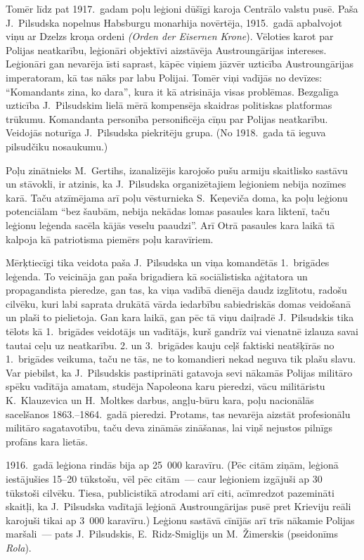 \documentclass[twoside,a5paper,12pt,fleqn,openany]{extbook}
\newcommand{\pltxti}[1]{\textit{\textpolish{#1}}}
\newcommand{\detxti}[1]{\textit{\textgerman{#1}}}
\begin{document}
Tomēr līdz pat 1917.~gadam poļu leģioni dūšīgi karoja Centrālo valstu pusē. Paša J.~Pilsudska nopelnus Habsburgu monarhija novērtēja, 1915.~gadā apbalvojot viņu ar Dzelzs kroņa ordeni \detxti{(Orden der Eisernen Krone}). Vēloties karot par Polijas neatkarību, leģionāri objektīvi aizstāvēja Austroungārijas intereses. Leģionāri gan nevarēja īsti saprast, kāpēc viņiem jāzvēr uzticība Austroungārijas imperatoram, kā tas nāks par labu Polijai. Tomēr viņi vadījās no devīzes: ``Komandants zina, ko dara'', kura it kā atrisināja visas problēmas. Bezgalīga uzticība J.~Pilsudskim lielā mērā kompensēja skaidras politiskas platformas trūkumu. Komandanta personība personificēja cīņu par Polijas neatkarību. Veidojās noturīga J.~Pilsudska piekritēju grupa. (No 1918.~gada tā ieguva pilsudčiku nosaukumu.)

Poļu zinātnieks M.~Gertihs, izanalizējis karojošo pušu armiju skaitlisko sastāvu un stāvokli, ir atzinis, ka J.~Pilsudska organizētajiem leģioniem nebija nozīmes karā. Taču atzīmējama arī poļu vēsturnieka S.~Keņeviča doma, ka poļu leģionu potenciālam ``bez šaubām, nebija nekādas lomas pasaules kara liktenī, taču leģionu leģenda sacēla kājās veselu paaudzi''. Arī Otrā pasaules kara laikā tā kalpoja kā patriotisma piemērs poļu karavīriem.

Mērķtiecīgi tika veidota paša J.~Pilsudska un viņa komandētās 1.~brigādes leģenda. To veicināja gan paša brigadiera kā sociālistiska aģitatora un propagandista pieredze, gan tas, ka viņa vadībā dienēja daudz izglītotu, radošu cilvēku, kuri labi saprata drukātā vārda iedarbību sabiedriskās domas veidošanā un plaši to pielietoja. Gan kara laikā, gan pēc tā viņu daiļradē J.~Pilsudskis tika tēlots kā 1.~brigādes veidotājs un vadītājs, kurš gandrīz vai vienatnē izlauza savai tautai ceļu uz neatkarību. 2. un 3.~brigādes kauju ceļš faktiski neatšķīrās no 1.~brigādes veikuma, taču ne tās, ne to komandieri nekad neguva tik plašu slavu. Var piebilst, ka J.~Pilsudskis pastiprināti gatavoja sevi nākamās Polijas militāro spēku vadītāja amatam, studēja Napoleona karu pieredzi, vācu militāristu K.~Klauzevica un H.~Moltkes darbus, angļu-būru kara, poļu nacionālās sacelšanos 1863.--1864.~gadā pieredzi. Protams, tas nevarēja aizstāt profesionālu militāro sagatavotību, taču deva zināmās zināšanas, lai viņš nejustos pilnīgs profāns kara lietās.

1916.~gadā leģiona rindās bija ap 25~000 karavīru. (Pēc citām ziņām, leģionā iestājušies 15--20 tūkstošu, vēl pēc citām~--- caur leģioniem izgājuši ap 30~ tūkstoši cilvēku. Tiesa, publicistikā atrodami arī citi, acīmredzot pazemināti skaitļi, ka J.~Pilsudska vadītajā leģionā Austroungārijas pusē pret Krieviju reāli karojuši tikai ap 3~000 karavīru.) Leģionu sastāvā cīnījās arī trīs nākamie Polijas maršali~--- pats J.~Pilsudskis, E.~Ridz-Smiglijs un M.~Žimerskis (pseidonīms \pltxti{Rola}).
\end{document}
